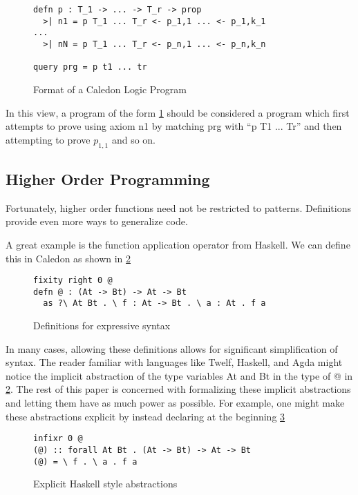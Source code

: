 \begin{figure}[H]
\begin{lstlisting}
defn p : T_1 -> ... -> T_r -> prop
  >| n1 = p T_1 ... T_r <- p_1,1 ... <- p_1,k_1
...
  >| nN = p T_1 ... T_r <- p_n,1 ... <- p_n,k_n

query prg = p t1 ... tr
\end{lstlisting}
\caption{Format of a Caledon Logic Program}
\label{code:format}
\end{figure}

In this view, a program of the form \ref{code:format}
should be considered a program which first attempts to prove using axiom n1 by matching prg with ``p T1 ... Tr'' and then
attempting to prove $p_{1,1}$ and so on.


\FloatBarrier
\subsection{Higher Order Programming}

Fortunately, higher order functions need not be restricted to patterns.  
Definitions provide even more ways to generalize code. 

A great example is the function application operator from Haskell.  
We can define this in Caledon as shown in \ref{code:macros}

\begin{figure}[H]
\begin{lstlisting}
fixity right 0 @
defn @ : (At -> Bt) -> At -> Bt
  as ?\ At Bt . \ f : At -> Bt . \ a : At . f a

\end{lstlisting}
\caption{Definitions for expressive syntax}
\label{code:macros}
\end{figure}

In many cases, allowing these definitions allows for significant simplification of syntax.
The reader familiar with languages like Twelf, Haskell, and Agda might notice the 
implicit abstraction of the type variables At and Bt in the type of @ in \ref{code:macros}. The rest of this
paper is concerned with formalizing these implicit abstractions and letting them have
as much power as possible. For example, one might make these abstractions explicit by
instead declaring at the beginning \ref{code:expHask}

\begin{figure}[H]
\begin{lstlisting}
infixr 0 @
(@) :: forall At Bt . (At -> Bt) -> At -> Bt
(@) = \ f . \ a . f a
\end{lstlisting}
\caption{Explicit Haskell style abstractions}
\label{code:expHask}
\end{figure}

